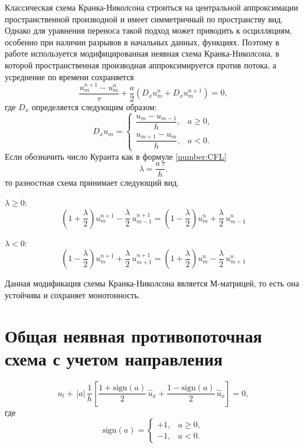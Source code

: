 \documentclass[a4paper,14pt]{extreport}
\begin{document}
Классическая схема Кранка-Николсона строиться на центральной аппроксимации пространственной производной и имеет симметричный по пространству вид. Однако для уравнения переноса такой подход может приводить к осцилляциям, особенно при наличии разрывов в начальных данных, функциях. Поэтому в работе используется модифицированная неявная схема Кранка-Николсона, в которой пространственная производная аппроксимируется против потока, а усреднение по времени сохраняется
\begin{equation}
	\frac{u_m^{n+1}-u_m^n}{\tau}
	+
	\frac{a}{2}
	\left(
	D_x u_m^{n}
	+
	D_x u_m^{n+1}
	\right)
	=0,
\end{equation}
где $D_x$ определяется следующим образом:
\begin{equation*}
	D_x u_m =
	\begin{cases}
		\dfrac{u_m-u_{m-1}}{h}, & a \ge 0, \\[10pt]
		\dfrac{u_{m+1}-u_m}{h}, & a < 0.
	\end{cases}
\end{equation*}
Если обозначить число Куранта как в формуле \ref{number:CFL}
\begin{equation*}
	\lambda = \dfrac{a\,\tau}{h}.
\end{equation*}
то разностная схема принимает следующий вид.

 $\lambda \ge 0$:
\begin{equation*}
	\left(1+\frac{\lambda}{2}\right)u_m^{n+1}
	-
	\frac{\lambda}{2}\,u_{m-1}^{n+1}
	=
	\left(1-\frac{\lambda}{2}\right)u_m^{n}
	+
	\frac{\lambda}{2}\,u_{m-1}^{n}
\end{equation*}

 $\lambda < 0$:
\begin{equation*}
	\left(1-\frac{\lambda}{2}\right)u_m^{n+1}
	+
	\frac{\lambda}{2}\,u_{m+1}^{n+1}
	=
	\left(1+\frac{\lambda}{2}\right)u_m^{n}
	-
	\frac{\lambda}{2}\,u_{m+1}^{n}
\end{equation*}

Данная модификация схемы Кранка-Николсона является М-матрицей, то есть она устойчива и сохраняет монотонность.

\section*{Общая неявная противопоточная схема с учетом направления}
\begin{equation}
	u_t
	+
	\, |a| \,\frac{1}{h} \left[
	\frac{1+\mathrm{sign}(a)}{2} \,	\hat{u}_{\bar{x}}
	+
	\frac{1-\mathrm{sign}(a)}{2} \,\hat{u}_x
	\right] = 0,
\end{equation}
где
\[
\mathrm{sign}(a) =
\begin{cases}
	+1, & a \ge 0, \\
	-1, & a < 0.
\end{cases}
\]
\end{document}
